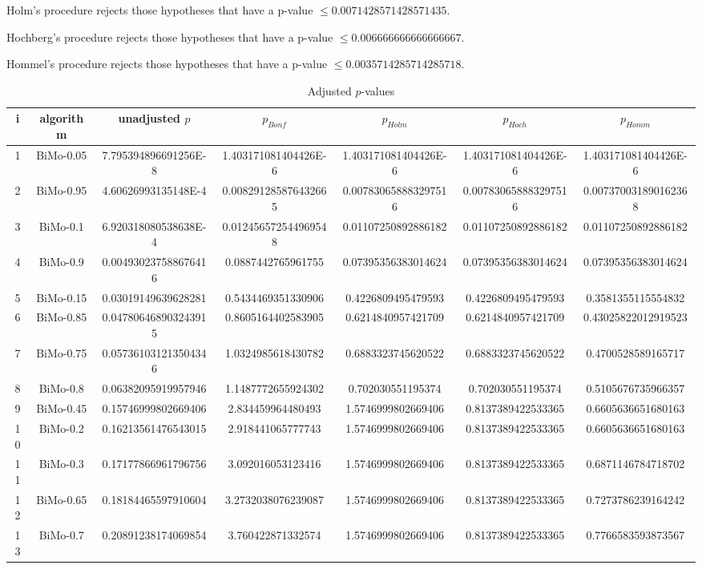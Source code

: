 \documentclass[a4paper,10pt]{article}
\begin{document}
\begin{landscape}
Holm's procedure rejects those hypotheses that have a p-value $\le0.0071428571428571435$.


Hochberg's procedure rejects those hypotheses that have a p-value $\le0.006666666666666667$.


Hommel's procedure rejects those hypotheses that have a p-value $\le0.0035714285714285718$.


\begin{table}[!htp]
\centering\tiny
\caption{Adjusted $p$-values}
\begin{tabular}{ccccccc}
i&algorithm&unadjusted $p$&$p_{Bonf}$&$p_{Holm}$&$p_{Hoch}$&$p_{Homm}$\\
\hline
1&BiMo-0.05&7.795394896691256E-8&1.403171081404426E-6&1.403171081404426E-6&1.403171081404426E-6&1.403171081404426E-6\\
2&BiMo-0.95&4.60626993135148E-4&0.008291285876432665&0.007830658883297516&0.007830658883297516&0.007370031890162368\\
3&BiMo-0.1&6.920318080538638E-4&0.012456572544969548&0.01107250892886182&0.01107250892886182&0.01107250892886182\\
4&BiMo-0.9&0.004930237588676416&0.0887442765961755&0.07395356383014624&0.07395356383014624&0.07395356383014624\\
5&BiMo-0.15&0.03019149639628281&0.5434469351330906&0.4226809495479593&0.4226809495479593&0.3581355115554832\\
6&BiMo-0.85&0.047806468903243915&0.8605164402583905&0.6214840957421709&0.6214840957421709&0.43025822012919523\\
7&BiMo-0.75&0.057361031213504346&1.0324985618430782&0.6883323745620522&0.6883323745620522&0.4700528589165717\\
8&BiMo-0.8&0.06382095919957946&1.1487772655924302&0.702030551195374&0.702030551195374&0.5105676735966357\\
9&BiMo-0.45&0.15746999802669406&2.834459964480493&1.5746999802669406&0.8137389422533365&0.6605636651680163\\
10&BiMo-0.2&0.16213561476543015&2.918441065777743&1.5746999802669406&0.8137389422533365&0.6605636651680163\\
11&BiMo-0.3&0.17177866961796756&3.092016053123416&1.5746999802669406&0.8137389422533365&0.6871146784718702\\
12&BiMo-0.65&0.18184465597910604&3.2732038076239087&1.5746999802669406&0.8137389422533365&0.7273786239164242\\
13&BiMo-0.7&0.20891238174069854&3.760422871332574&1.5746999802669406&0.8137389422533365&0.7766583593873567\\

\end{tabular}
\end{table}
\end{landscape}
\end{document}
